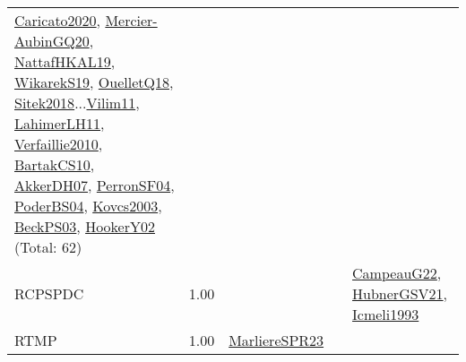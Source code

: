 {\begin{longtable}{p{3cm}r>{\raggedright\arraybackslash}p{6cm}>{\raggedright\arraybackslash}p{6cm}>{\raggedright\arraybackslash}p{8cm}}
\hyperref[detail:Caricato2020]{Caricato2020}, \hyperref[detail:Mercier-AubinGQ20]{Mercier-AubinGQ20}, \hyperref[detail:NattafHKAL19]{NattafHKAL19}, \hyperref[detail:WikarekS19]{WikarekS19}, \hyperref[detail:OuelletQ18]{OuelletQ18}, \hyperref[detail:Sitek2018]{Sitek2018}...\hyperref[detail:Vilim11]{Vilim11}, \hyperref[detail:LahimerLH11]{LahimerLH11}, \hyperref[detail:Verfaillie2010]{Verfaillie2010}, \hyperref[detail:BartakCS10]{BartakCS10}, \hyperref[detail:AkkerDH07]{AkkerDH07}, \hyperref[detail:PerronSF04]{PerronSF04}, \hyperref[detail:PoderBS04]{PoderBS04}, \hyperref[detail:Kovcs2003]{Kovcs2003}, \hyperref[detail:BeckPS03]{BeckPS03}, \hyperref[detail:HookerY02]{HookerY02} (Total: 62)\\
\index{RCPSPDC}\index{Classification!RCPSPDC}RCPSPDC &  1.00 &  &  & \hyperref[detail:CampeauG22]{CampeauG22}, \hyperref[detail:HubnerGSV21]{HubnerGSV21}, \hyperref[detail:Icmeli1993]{Icmeli1993}\\
\index{RTMP}\index{Classification!RTMP}RTMP &  1.00 & \hyperref[detail:MarliereSPR23]{MarliereSPR23} &  & \\

\end{longtable}}
